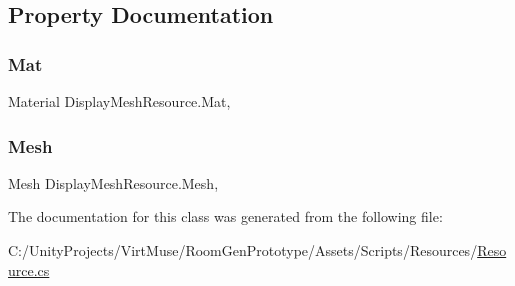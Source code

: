 \subsection{Property Documentation}
\mbox{\label{class_display_mesh_resource_addb4fd55147fa231d6ea1acc8a7a6cf5}} 
\subsubsection{\texorpdfstring{Mat}{Mat}}
{\footnotesize\ttfamily Material Display\+Mesh\+Resource.\+Mat\hspace{0.3cm}{\ttfamily [get]}, {\ttfamily [set]}}

\mbox{\label{class_display_mesh_resource_a3ea74e82fc6354c0d84ed87b996e64d9}} 
\subsubsection{\texorpdfstring{Mesh}{Mesh}}
{\footnotesize\ttfamily Mesh Display\+Mesh\+Resource.\+Mesh\hspace{0.3cm}{\ttfamily [get]}, {\ttfamily [set]}}



The documentation for this class was generated from the following file\+:\begin{DoxyCompactItemize}
\item 
C\+:/\+Unity\+Projects/\+Virt\+Muse/\+Room\+Gen\+Prototype/\+Assets/\+Scripts/\+Resources/\mbox{\hyperlink{_resource_8cs}{Resource.\+cs}}\end{DoxyCompactItemize}
